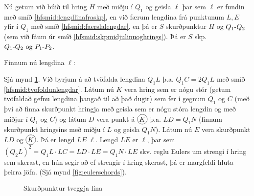 \begin{frame}
  \begin{hfsmid}\label{hfsmid:skptveggjalina}
    Nú getum við búið til hring \(H\)
    með miðju í \(Q_1\) og geisla \(\ell\) þar sem \(\ell\)
    er fundin með smíð \ref{hfsmid:lengdlinafraskp}, en við færum
    lengdina frá punktunum \(L,E\) yfir í \(Q_1\)
    með smíð \ref{hfsmid:faerslalengdar}, en þá er \(S\)
    skurðpunktur \(H\) og \(\lin{Q_1}{Q_2}\)
    (sem við fáum úr smíð \ref{hfsmid:skpmidjulinuoghrings}).  Þá er
    \(S\) skp. \(\lin{Q_1}{Q_2} \Og \lin{P_1}{P_2}\).
  \end{hfsmid}
\end{frame}

\begin{frame}
  Finnum nú lengdina \(\ell\):
  \begin{hfsmid}\label{hfsmid:lengdlinafraskp}
    Sjá mynd \ref{fig:mmcon5}.
    Við byrjum á að tvöfalda lengdina \(Q_1L\) þ.a. \(Q_1C = 2Q_1L\) með smíð
    \ref{hfsmid:tvofoldunlengdar}. Látum nú \(K\) vera hring sem er nógu stór
    (getum tvöfaldað gefnu lengdina þangað til að það dugir)
    sem fer í gegnum \(Q_1\) og \(C\) (með því að finna skurðpunkt hringja með
    geisla sem er nógu stóra lengdin og með miðjur í \(Q_1\) og \(C\)) og
    látum \(D\) vera punkt á \(\hri{K}\) þ.a. \(LD = Q_1N\) (finnum skurðpunkt
    hringsins með miðju í \(L\) og geisla \(Q_1N\)). Látum nú
    \(E\) vera skurðpunkt \(LD\) og \(\hri{K}\). Þá er lengd \(LE\) \(\ell\).
    Lengd \(LE\) er \(\ell\), þar sem \((Q_2L)^2 = Q_1L \cdot LC = LD\cdot LE = Q_1N \cdot LE\)
    skv. reglu Eulers um strengi í hring sem skerast,
    en hún segir að ef strengir í hring skerast, þá er margfeldi hluta þeirra jöfn.
    (Sjá mynd  \ref{fig:eulerschords}).
  \end{hfsmid}
\end{frame}

\begin{frame}
  \begin{figure}[H]
    \centering
    \ifglaerur
        
    \else
        
    \fi
    \caption{Skurðpunktur tveggja lína}
    \label{fig:mmcon5}
  \end{figure}
\end{frame}




